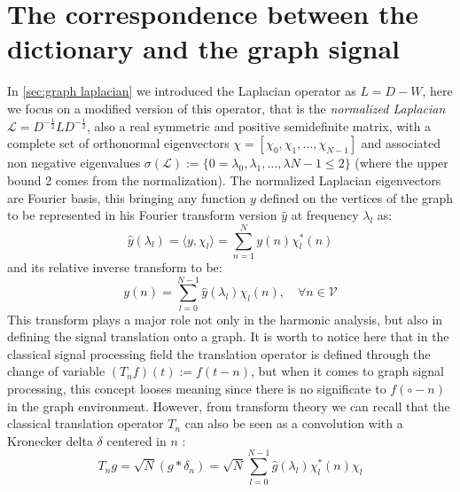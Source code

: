 \section{The correspondence between the dictionary and the graph signal}
In \ref{sec:graph laplacian} we introduced the Laplacian operator as $L = D - W$, here we focus on a modified version of this operator, that is the \textit{normalized Laplacian} $\mathcal{L} = D^{-\frac{1}{2}}LD^{-\frac{1}{2}}$, also a real symmetric and positive semidefinite matrix, with a complete set of orthonormal eigenvectors $\textbf{$\chi$} = [\chi_0,\chi_1,\dots,\chi_{N-1}]$ and associated non negative eigenvalues $\sigma(\mathcal{L}) := \{ 0 = \lambda_0,\lambda_1,\dots,\lambda{N-1} \leq 2 \}$ (where the upper bound 2 comes from the normalization).
The normalized Laplacian eigenvectors are Fourier basis, this bringing any function $y$ defined on the vertices of the graph to be represented in his Fourier transform version $\hat{y}$ at frequency $\lambda_l$ as:
\begin{equation}
\hat{y}(\lambda_l) = \langle y, \chi_l \rangle = \sum_{n=1}^{N} y(n)\chi_l^{*}(n)
\end{equation}
and its relative inverse transform to be:
\begin{equation}
y(n) = \sum_{l=0}^{N-1} \hat{y}(\lambda_l)\chi_l(n), \quad \forall n \in \mathcal{V}
\end{equation}
This transform plays a major role not only in the harmonic analysis, but also in defining the signal translation onto a graph. It is worth to notice here that in the classical signal processing field the translation operator is defined through the change of variable $(T_n f)(t) := f(t-n)$, but when it comes to graph signal processing, this concept looses meaning since there is no significate to $f(\circ - n)$ in the graph environment. However, from transform theory we can recall that the classical translation operator $T_n$ can also be seen as a convolution with a Kronecker delta $\delta$ centered in $n$\cite{Shuman2013} \cite{Thanou2014}:
\begin{equation}
T_n g = \sqrt{N}(g * \delta_n) = \sqrt{N}\sum_{l=0}^{N-1}\hat{g}(\lambda_l)\chi_l^{*}(n)\chi_l
\label{eq:translation}
\end{equation}

